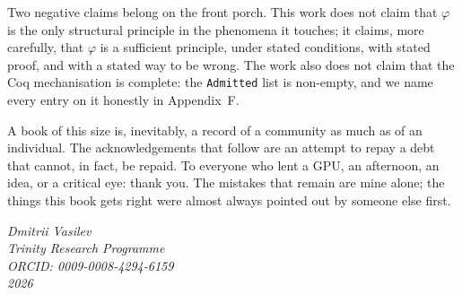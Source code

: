 Two negative claims belong on the front porch. This work does not
claim that \(\varphi\) is the only structural principle in the
phenomena it touches; it claims, more carefully, that \(\varphi\) is
a sufficient principle, under stated conditions, with stated proof,
and with a stated way to be wrong. The work also does not claim that
the Coq mechanisation is complete: the \texttt{Admitted} list is
non-empty, and we name every entry on it honestly in Appendix~F.

A book of this size is, inevitably, a record of a community as much
as of an individual. The acknowledgements that follow are an attempt
to repay a debt that cannot, in fact, be repaid. To everyone who lent
a GPU, an afternoon, an idea, or a critical eye: thank you. The
mistakes that remain are mine alone; the things this book gets right
were almost always pointed out by someone else first.

\bigskip
\noindent\textit{Dmitrii Vasilev}\\
\textit{Trinity Research Programme}\\
\textit{ORCID: 0009-0008-4294-6159}\\
\textit{2026}
